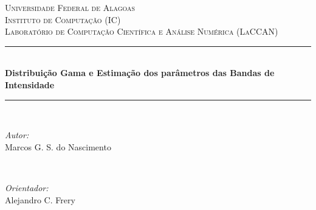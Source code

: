 \begin{titlepage}

\newcommand{\HRule}{\rule{\linewidth}{0.5mm}} %

\center %
 

\textsc{\LARGE Universidade Federal de Alagoas}\\[1.5cm] %
\textsc{\Large Instituto de Computação (IC)}\\[0.5cm] %
\textsc{\large Laboratório de Computação Científica e Análise Numérica (LaCCAN)}\\[3.5cm] %


\HRule \\[0.4cm]
{ \LARGE \bfseries Distribuição Gama e Estimação dos parâmetros das Bandas de Intensidade}\\[0.4cm] 
\HRule \\[2.5cm]
 

\begin{minipage}{0.4\textwidth}
\begin{flushleft} \large
\emph{Autor:}\\
Marcos G. S. do Nascimento %
\end{flushleft}
\end{minipage}
~
\begin{minipage}{0.4\textwidth}
\begin{flushright} \large
\emph{Orientador:} \\
Alejandro C. Frery  %
\end{flushright}
\end{minipage}\\[10cm]


\end{titlepage}
